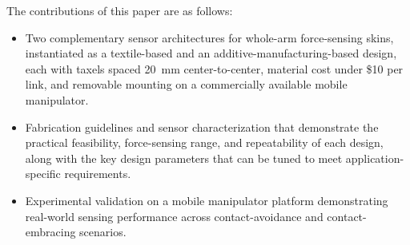 


The contributions of this paper are as follows:
\begin{itemize}[leftmargin=*]
\item Two complementary sensor architectures for whole-arm force-sensing skins, instantiated as a textile-based and an additive-manufacturing-based design, each with taxels spaced 20~mm center-to-center, material cost under \$10 per link, and removable mounting on a commercially available mobile manipulator.
\item Fabrication guidelines and sensor characterization that demonstrate the practical feasibility, force-sensing range, and repeatability of each design, along with the key design parameters that can be tuned to meet application-specific requirements.
\item Experimental validation on a mobile manipulator platform demonstrating real-world sensing performance across contact-avoidance and contact-embracing scenarios.
\end{itemize}
